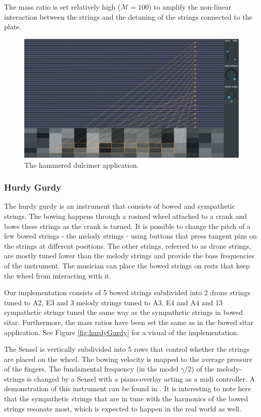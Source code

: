 The mass ratio is set relatively high ($\mathcal{M} = 100$) to amplify the non-linear interaction between the strings and the detuning of the strings connected to the plate. 

\begin{figure}[h]
\centering
\includegraphics[width=\paperFigWidth\textwidth]{figures/dulcimer.png}
\caption{The hammered dulcimer application. \label{fig:dulcimer}}
\end{figure}

\subsubsection{Hurdy Gurdy}
The hurdy gurdy is an instrument that consists of bowed and sympathetic strings. The bowing happens through a rosined wheel attached to a crank and bows these strings as the crank is turned. It is possible to change the pitch of a few bowed strings - the melody strings - using buttons that press tangent pins on the strings at different positions. The other strings, referred to as drone strings, are mostly tuned lower than the melody strings and provide the bass frequencies of the instrument. The musician can place the bowed strings on rests that keep the wheel from interacting with it. 

Our implementation consists of 5 bowed strings subdivided into 2 drone strings tuned to A2, E3 and 3 melody strings tuned to A3, E4 and A4 and 13 sympathetic strings tuned the same way as the sympathetic strings in bowed sitar. Furthermore, the mass ratios have been set the same as in the bowed sitar application. See Figure \ref{fig:hurdyGurdy} for a visual of the implementation.

The Sensel is vertically subdivided into 5 rows that control whether the strings are placed on the wheel. The bowing velocity is mapped to the average pressure of the fingers. The fundamental frequency (in the model $\gamma / 2$) of the melody-strings is changed by a Sensel with a piano-overlay acting as a midi controller. A demonstration of this instrument can be found in \cite{video}. It is interesting to note here that the sympathetic strings that are in tune with the harmonics of the bowed strings resonate most, which is expected to happen in the real world as well.

